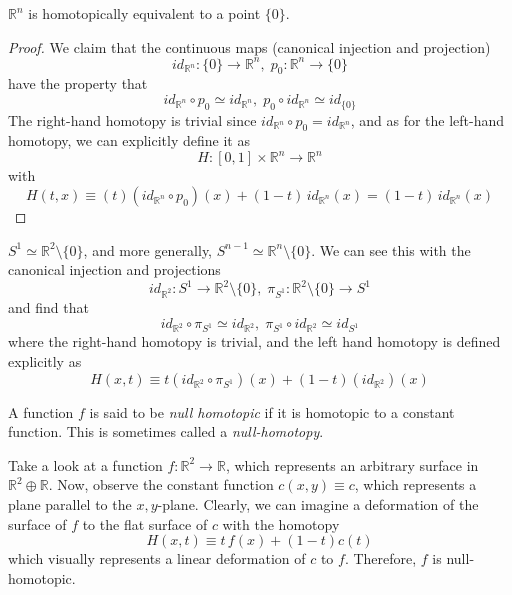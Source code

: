   \begin{proposition}
  $\mathbb{R}^n$ is homotopically equivalent to a point $\{0\}$.
  \end{proposition}
  \begin{proof}
  We claim that the continuous maps (canonical injection and projection)
  \[id_{\mathbb{R}^n}: \{0\} \longrightarrow \mathbb{R}^n , \; p_0 : \mathbb{R}^n \longrightarrow \{0\}\]
  have the property that 
  \[id_{\mathbb{R}^n} \circ p_0 \simeq id_{\mathbb{R}^n} , \; p_0 \circ id_{\mathbb{R}^n} \simeq id_{\{0\}}\]
  The right-hand homotopy is trivial since $id_{\mathbb{R}^n} \circ p_0 = id_{\mathbb{R}^n}$, and as for the left-hand homotopy, we can explicitly define it as
  \[H: [0,1] \times \mathbb{R}^n \longrightarrow \mathbb{R}^n\]
  with
  \[H(t, x) \equiv (t) (id_{\mathbb{R}^n} \circ p_0 )(x) + (1-t) \, id_{\mathbb{R}^n} (x) = (1-t)\, id_{\mathbb{R}^n} (x)\]
  \end{proof}

  \begin{example}
  $S^1 \simeq \mathbb{R}^2 \setminus \{0\}$, and more generally, $S^{n-1} \simeq \mathbb{R}^n \setminus \{0\}$. We can see this with the canonical injection and projections
  \[id_{\mathbb{R}^2}: S^1 \longrightarrow \mathbb{R}^2 \setminus \{0\}, \; \pi_{S^1}: \mathbb{R}^2 \setminus \{0\} \longrightarrow S^1\]
  and find that
  \[id_{\mathbb{R}^2} \circ \pi_{S^1} \simeq id_{\mathbb{R}^2}, \; \pi_{S^1} \circ id_{\mathbb{R}^2} \simeq id_{S^1}\]
  where the right-hand homotopy is trivial, and the left hand homotopy is defined explicitly as
  \[H(x, t) \equiv t (id_{\mathbb{R}^2} \circ \pi_{S^1})(x) + (1-t) (id_{\mathbb{R}^2})(x)\]
  \end{example}

  \begin{definition}
  A function $f$ is said to be \textit{null homotopic} if it is homotopic to a constant function. This is sometimes called a \textit{null-homotopy}. 
  \end{definition}

  \begin{example}
  Take a look at a function $f: \mathbb{R}^2 \longrightarrow \mathbb{R}$, which represents an arbitrary surface in $\mathbb{R}^2 \oplus \mathbb{R}$. Now, observe the constant function $c(x, y) \equiv c$, which represents a plane parallel to the $x, y$-plane. Clearly, we can imagine a deformation of the surface of $f$ to the flat surface of $c$ with the homotopy
  \[H(x, t) \equiv t \, f(x) + (1-t) c(t)\]
  which visually represents a linear deformation of $c$ to $f$. Therefore, $f$ is null-homotopic. 
  \end{example}

